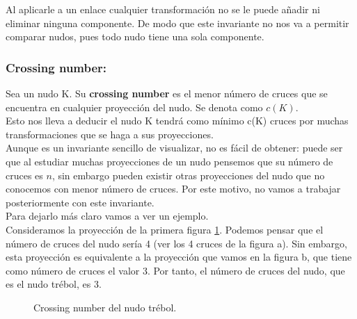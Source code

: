 \documentclass[14pt]{extarticle}
\begin{document}
Al aplicarle a un enlace cualquier transformación no se le puede añadir ni eliminar ninguna componente. De modo que este invariante no nos va a permitir comparar nudos, pues todo nudo tiene una sola componente. \\

\bigskip
\begin{center}
	\subsubsection{Crossing number:}
\end{center}
Sea un nudo K. Su \textbf{crossing number} es el menor número de cruces que se encuentra en cualquier proyección del nudo. Se denota como $c(K)$. \\

Esto nos lleva a deducir el nudo K tendrá como mínimo c(K) cruces por muchas transformaciones que se haga a sus proyecciones.\\

Aunque es un invariante sencillo de visualizar, no es fácil de obtener: puede ser que al estudiar muchas proyecciones de un nudo pensemos que su número de cruces es $n$, sin embargo pueden existir otras proyecciones del nudo que no conocemos con menor número de cruces. Por este motivo, no vamos a trabajar posteriormente con este invariante.\\

Para dejarlo más claro vamos a ver un ejemplo.\\
Consideramos la proyección de la primera figura \ref{cross1}. Podemos pensar que el número de cruces del nudo sería 4 (ver los 4 cruces de la figura a). Sin embargo, esta proyección es equivalente a la proyección que vamos en la figura b, que tiene como número de cruces el valor 3. Por tanto, el número de cruces del nudo, que es el nudo trébol, es 3. 
   \begin{figure}[h!]
   	\centering
   	\caption{Crossing number del nudo trébol.}
   	\label{cross1} 
   \end{figure}  
\end{document}
